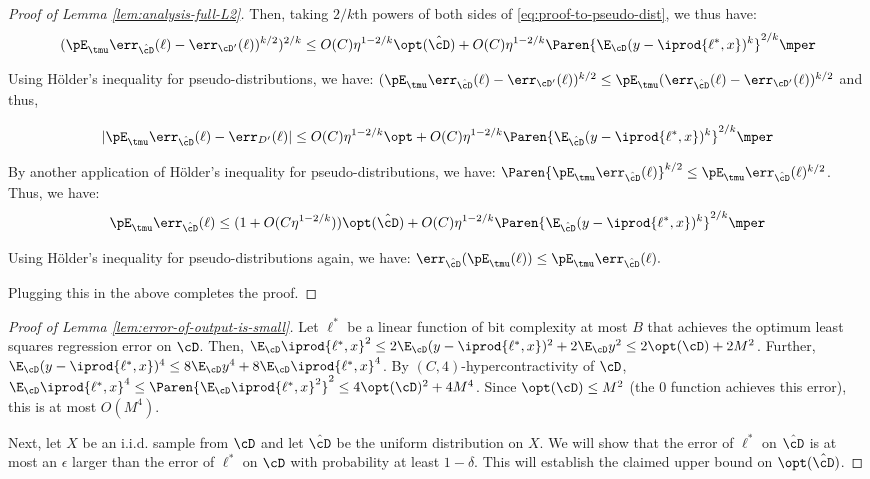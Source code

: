{\begin{proof}[Proof of Lemma \ref{lem:analysis-full-L2}]
Then, taking $2/k$th powers of both sides of \eqref{eq:proof-to-pseudo-dist}, we thus have:
\[
(\pE_{\tmu} \err_{\hat{\cD}}(\ell)- \err_{\cD'}(\ell))^{k/2})^{2/k} \leq O(C) \eta^{1-2/k} \opt(\hat{\cD}) + O(C) \eta^{1-2/k} \Paren{\E_\cD (y-\iprod{\ell^{*},x})^k}^{2/k}\mper
\]

Using H\"older's inequality for pseudo-distributions, we have:
$(\pE_{\tmu} \err_{\hat{\cD}} (\ell) - \err_{\cD'}(\ell))^{k/2} \leq \pE_{\tmu} (\err_{\hat{\cD}}(\ell) - \err_{\cD'}(\ell))^{k/2}$ and thus, 

\[
|\pE_{\tmu} \err_{\hat{\cD}} (\ell) - \err_{D'}(\ell)| \leq O(C) \eta^{1-2/k} \opt + O(C) \eta^{1-2/k} \Paren{\E_{\hat{\cD}} (y-\iprod{\ell^{*},x})^k}^{2/k}\mper
\]

By another application of H\"older's inequality for pseudo-distributions, we have: $\Paren{\pE_{\tmu} \err_{\hat{\cD}}(\ell)}^{k/2} \leq \pE_{\tmu} \err_{\hat{\cD}} (\ell)^{k/2}$. Thus, we have:
\[
\pE_{\tmu} \err_{\hat{\cD}} (\ell)  \leq (1+O(C \eta^{1-2/k})) \opt(\hat{\cD}) + O(C) \eta^{1-2/k} \Paren{\E_{\hat{\cD}} (y-\iprod{\ell^{*},x})^k}^{2/k}\mper
\]

Using H\"older's inequality for pseudo-distributions again, we have: 
$\err_{\hat{\cD}}(\pE_{\tmu}(\ell)) \leq \pE_{\tmu} \err_{\hat{\cD}} (\ell) .$ 

Plugging this in the above completes the proof. 





\end{proof}


\begin{proof}[Proof of Lemma \ref{lem:error-of-output-is-small}]
Let $\ell^{*}$ be a linear function of bit complexity at most $B$ that achieves the optimum least squares regression error on $\cD$. Then, $\E_{\cD} \iprod{\ell^{*},x}^2 \leq 2\E_{\cD} (y - \iprod{\ell^{*},x})^2 + 2 \E_{\cD} y^2 \leq 2 \opt(\cD) + 2M^2$. Further, $\E_{\cD} (y - \iprod{\ell^{*},x})^4 \leq 8 \E_{\cD} y^4 + 8 \E_{\cD} \iprod{\ell^{*},x}^4$. By $(C,4)$-hypercontractivity of $\cD$,  $\E_{\cD} \iprod{\ell^{*},x}^4 \leq \Paren{\E_{\cD} \iprod{\ell^{*},x}^2}^2 \leq 4 \opt(\cD)^2 + 4 M^4$. Since $\opt(\cD) \leq M^2$ (the $0$ function achieves this error), this is at most $O(M^4)$.  

Next, let $X$ be an i.i.d. sample from $\cD$ and let $\hat{\cD}$ be the uniform distribution on $X$. We will show that the error of $\ell^{*}$ on $\hat{\cD}$ is at most an $\epsilon$ larger than the error of $\ell^{*}$ on $\cD$ with probability at least $1-\delta$. This will establish the claimed upper bound on $\opt(\hat{\cD})$.


\end{proof}}
